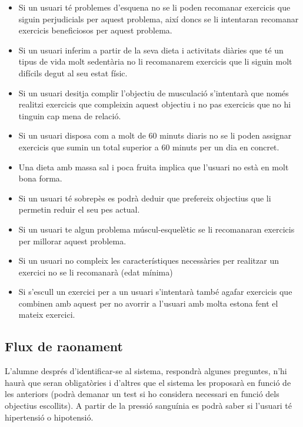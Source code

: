\documentclass[a4paper, 12pt, UTF8]{article}
\begin{document}
\begin{itemize}
	\item Si un usuari té problemes d'esquena no se li poden recomanar exercicis que siguin perjudicials per aquest problema, així doncs se li intentaran recomanar exercicis beneficiosos per aquest problema.
	
	\item Si un usuari inferim a partir de la seva dieta i activitats diàries que té un tipus de vida molt sedentària no li recomanarem exercicis que li siguin molt difícils degut al seu estat físic.
	
	\item Si un usuari desitja complir l'objectiu de musculació s'intentarà que només realitzi exercicis que compleixin aquest objectiu i no pas exercicis que no hi tinguin cap mena de relació.
	
	\item Si un usuari disposa com a molt de 60 minuts diaris no se li poden assignar exercicis que sumin un total superior a 60 minuts per un dia en concret.
	
	\item Una dieta amb massa sal i poca fruita implica que l'usuari no està en molt bona forma.
	
	\item Si un usuari té sobrepès es podrà deduir que prefereix objectius que li permetin reduir el seu pes actual.
	
	\item Si un usuari te algun problema múscul-esquelètic se li recomanaran exercicis per millorar aquest problema.
	
	\item Si un usuari no compleix les característiques necessàries per realitzar un exercici no se li recomanarà (edat mínima)
	
	\item Si s'escull un exercici per a un usuari s'intentarà també agafar exercicis que combinen amb aquest per no avorrir a l'usuari amb molta estona fent el mateix exercici.
\end{itemize}

\subsection{Flux de raonament}

L'alumne després d'identificar-se al sistema, respondrà algunes preguntes, n'hi haurà que seran obligatòries i d'altres que el sistema les proposarà en funció de les anteriors (podrà demanar un test si ho considera necessari en funció dels objectius escollits). A partir de la pressió sanguínia es podrà saber si l'usuari té hipertensió o hipotensió.
\end{document}
